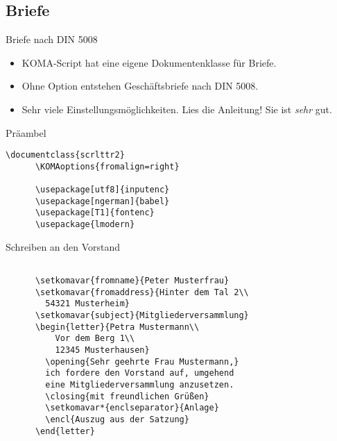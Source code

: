 \malte


\subsection{Briefe}

\begin{Frame}[fragile]{Briefe nach DIN 5008}
  \begin{itemize}
    \item KOMA-Script hat eine eigene Dokumentenklasse für Briefe.
    \item Ohne Option entstehen Geschäftsbriefe nach DIN 5008.
    \item Sehr viele Einstellungsmöglichkeiten. \newline
      \alert{Lies die Anleitung!} Sie ist \emph{sehr} gut.
  \end{itemize}

  \xxx

  \begin{Block}{Präambel}
    \begin{lstlisting}[style=block,gobble=6]
      \documentclass{scrlttr2}
      \KOMAoptions{fromalign=right}

      \usepackage[utf8]{inputenc}
      \usepackage[ngerman]{babel}
      \usepackage[T1]{fontenc}
      \usepackage{lmodern}
     \end{lstlisting}
  \end{Block}
\end{Frame}

\begin{Frame}[fragile]{Schreiben an den Vorstand}
  \begin{lstlisting}[gobble=4]
    
      \setkomavar{fromname}{Peter Musterfrau}
      \setkomavar{fromaddress}{Hinter dem Tal 2\\
        54321 Musterheim}
      \setkomavar{subject}{Mitgliederversammlung}
      \begin{letter}{Petra Mustermann\\
          Vor dem Berg 1\\
          12345 Musterhausen}
        \opening{Sehr geehrte Frau Mustermann,}
        ich fordere den Vorstand auf, umgehend
        eine Mitgliederversammlung anzusetzen.
        \closing{mit freundlichen Grüßen}
        \setkomavar*{enclseparator}{Anlage}
        \encl{Auszug aus der Satzung}
      \end{letter}
    
  \end{lstlisting}
\end{Frame}

